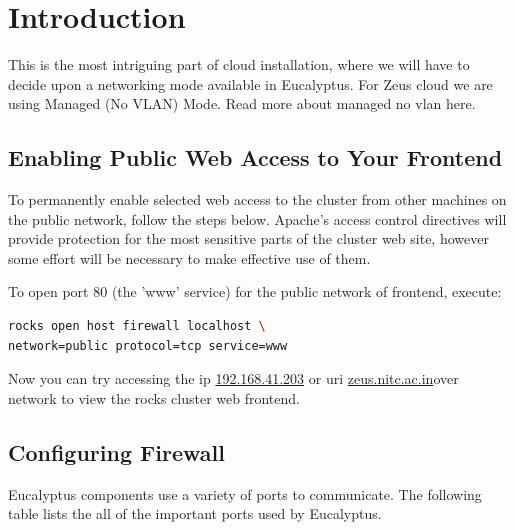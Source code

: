 \section{Introduction}
This is the most intriguing part of cloud installation, where we will have to decide upon a networking mode available in Eucalyptus. For Zeus cloud we are using Managed (No VLAN) Mode. Read more about managed no vlan here\cite{managednovlan}.

\subsection{Enabling Public Web Access to Your Frontend}

To permanently enable selected web access to the cluster from other machines on the public network, follow the steps below. Apache's access control directives will provide protection for the most sensitive parts of the cluster web site, however some effort will be necessary to make effective use of them.

To open port 80 (the 'www' service) for the public network of frontend,  execute:

\begin{lstlisting}[language=bash]
rocks open host firewall localhost \
network=public protocol=tcp service=www
\end{lstlisting}
Now you can try accessing the ip \url{192.168.41.203} or uri \url{zeus.nitc.ac.in}over network to view the rocks cluster web frontend.

\subsection{Configuring Firewall}

Eucalyptus components use a variety of ports to communicate. The following table lists the all of the important ports used by Eucalyptus.

